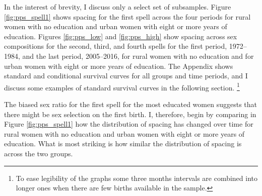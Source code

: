 \documentclass[12pt,letterpaper]{article}
\begin{document}
In the interest of brevity, I discuss only a select set of subsamples.
Figure \ref{fig:pps_spell1} shows spacing for the first spell across the
four periods for rural women with no education and urban women with 
eight or more years of education.
Figures \ref{fig:pps_low} and \ref{fig:pps_high} show spacing across sex
compositions for the second, third, and fourth spells for the first period, 
1972--1984, and the last period, 2005--2016, for rural women with no 
education and for urban women with eight or more years of education.
The Appendix shows standard and conditional survival curves for all groups and 
time periods, and I discuss some examples of standard survival
curves in the following section.%
\footnote{
To ease legibility of the graphs some three months intervals are combined
into longer ones when there are few births available in the sample.
}



The biased sex ratio for the first spell for the most educated 
women suggests that there might be sex selection on the first birth.
I, therefore, begin by comparing in Figure \ref{fig:pps_spell1} how the distribution 
of spacing has changed over time for rural women with no education and urban women 
with eight or more years of education.
What is most striking is how similar the distribution of spacing is across the
two groups.
\end{document}
